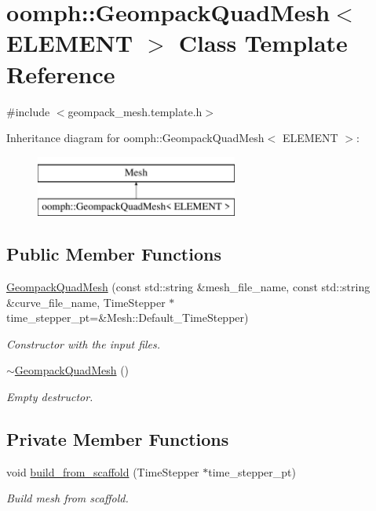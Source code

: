 \hypertarget{classoomph_1_1GeompackQuadMesh}{}\section{oomph\+:\+:Geompack\+Quad\+Mesh$<$ E\+L\+E\+M\+E\+NT $>$ Class Template Reference}
\label{classoomph_1_1GeompackQuadMesh}


{\ttfamily \#include $<$geompack\+\_\+mesh.\+template.\+h$>$}

Inheritance diagram for oomph\+:\+:Geompack\+Quad\+Mesh$<$ E\+L\+E\+M\+E\+NT $>$\+:\begin{figure}[H]
\begin{center}
\leavevmode
\includegraphics[height=2.000000cm]{classoomph_1_1GeompackQuadMesh}
\end{center}
\end{figure}
\subsection*{Public Member Functions}
\begin{DoxyCompactItemize}
\item 
\hyperlink{classoomph_1_1GeompackQuadMesh_aa1de3a1b4fedf1c404d6ed5bbebfb800}{Geompack\+Quad\+Mesh} (const std\+::string \&mesh\+\_\+file\+\_\+name, const std\+::string \&curve\+\_\+file\+\_\+name, Time\+Stepper $\ast$time\+\_\+stepper\+\_\+pt=\&Mesh\+::\+Default\+\_\+\+Time\+Stepper)
\begin{DoxyCompactList}\small\item\em Constructor with the input files. \end{DoxyCompactList}\item 
\hyperlink{classoomph_1_1GeompackQuadMesh_a7795c44ea2da182fbeffa30808481ffb}{$\sim$\+Geompack\+Quad\+Mesh} ()
\begin{DoxyCompactList}\small\item\em Empty destructor. \end{DoxyCompactList}\end{DoxyCompactItemize}
\subsection*{Private Member Functions}
\begin{DoxyCompactItemize}
\item 
void \hyperlink{classoomph_1_1GeompackQuadMesh_a714ee07999e06676f08080bac8c024db}{build\+\_\+from\+\_\+scaffold} (Time\+Stepper $\ast$time\+\_\+stepper\+\_\+pt)
\begin{DoxyCompactList}\small\item\em Build mesh from scaffold. \end{DoxyCompactList}\end{DoxyCompactItemize}
